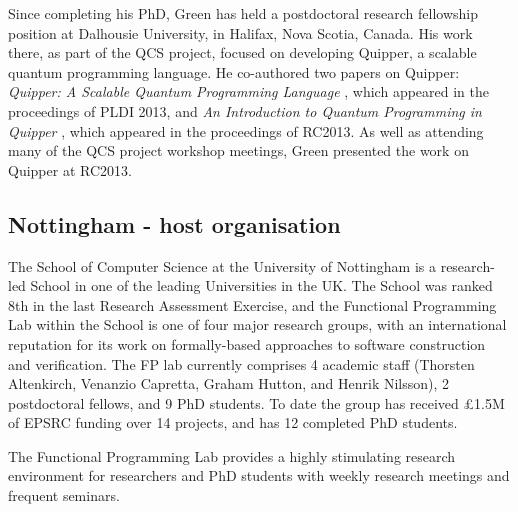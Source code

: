 \documentclass[a4paper]{article}
\begin{document}
Since completing his PhD, Green has held a postdoctoral research
fellowship position at Dalhousie University, in Halifax, Nova Scotia,
Canada. His work there, as part of the QCS project, focused on
developing Quipper, a scalable quantum programming language. He
co-authored two papers on Quipper: \emph{Quipper: A Scalable Quantum
  Programming Language} , which appeared
in the proceedings of PLDI 2013, and \emph{An Introduction to Quantum
  Programming in Quipper} , which appeared in
the proceedings of RC2013. As well as attending many of the QCS
project workshop meetings, Green presented the work on Quipper at
RC2013.


\subsection*{Nottingham - host organisation}

The School of Computer Science at the University of Nottingham
is a research-led School in one of the leading Universities in
the UK.	 The School was ranked 8th in the last Research Assessment
Exercise, and the Functional Programming Lab within the School is
one of four major research groups, with an international reputation
for its work on formally-based approaches to software construction
and verification.  The FP lab currently comprises 4 academic staff
(Thorsten Altenkirch, Venanzio Capretta, Graham Hutton, and Henrik
Nilsson), 2 postdoctoral fellows, and 9 PhD students.  To date the
group has received \pounds 1.5M of EPSRC funding over 14 projects,
and has 12 completed PhD students.

The Functional Programming Lab provides a highly stimulating
research environment for researchers and PhD students with weekly
research meetings and frequent seminars. %



\end{document}
